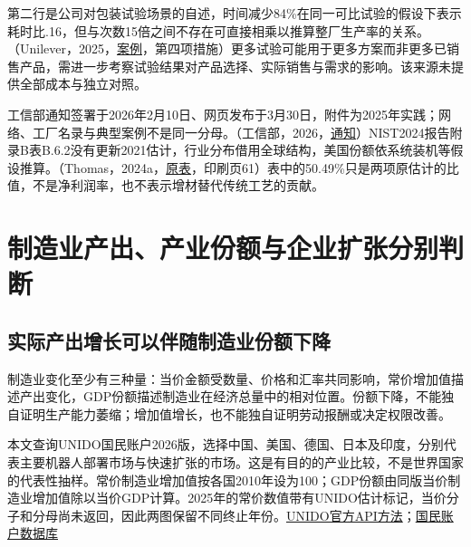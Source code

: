 \documentclass[UTF8,fontset=windows,12pt,a4paper,oneside,openany]{ctexbook}
\begin{document}
第二行是公司对包装试验场景的自述，时间减少84\%在同一可比试验的假设下表示耗时比.16，但与次数15倍之间不存在可直接相乘以推算整厂生产率的关系。（Unilever，2025，\href{https://www.unilever.com/news/news-search/2025/five-ways-unilevers-new-lighthouse-site-applies-ai-for-impact/}{案例}，第四项措施）更多试验可能用于更多方案而非更多已销售产品，需进一步考察试验结果对产品选择、实际销售与需求的影响。该来源未提供全部成本与独立对照。

工信部通知签署于2026年2月10日、网页发布于3月30日，附件为2025年实践；网络、工厂名录与典型案例不是同一分母。（工信部，2026，\href{https://www.miit.gov.cn/ztzl/rdzt/gyhlw/wjfb/art/2026/art_6b35987d001445d49487650795eac294.html}{通知}）NIST2024报告附录B表B.6.2没有更新2021估计，行业分布借用全球结构，美国份额依系统装机等假设推算。（Thomas，2024a，\href{https://tsapps.nist.gov/publication/get_pdf.cfm?pub_id=958865}{原表}，印刷页61）表中的50.49\%只是两项原估计的比值，不是净利润率，也不表示增材替代传统工艺的贡献。

\section{制造业产出、产业份额与企业扩张分别判断}

\subsection{实际产出增长可以伴随制造业份额下降}

制造业变化至少有三种量：当价金额受数量、价格和汇率共同影响，常价增加值描述产出变化，GDP份额描述制造业在经济总量中的相对位置。份额下降，不能独自证明生产能力萎缩；增加值增长，也不能独自证明劳动报酬或决定权限改善。

本文查询UNIDO国民账户2026版，选择中国、美国、德国、日本及印度，分别代表主要机器人部署市场与快速扩张的市场。这是有目的的产业比较，不是世界国家的代表性抽样。常价制造业增加值按各国2010年设为100；GDP份额由同版当价制造业增加值除以当价GDP计算。2025年的常价数值带有UNIDO估计标记，当价分子和分母尚未返回，因此两图保留不同终止年份。\href{https://stat.unido.org/unido-statistics-portal-api}{UNIDO官方API方法}；\href{https://stat.unido.org/data/table?dataset=national-accounts}{国民账户数据库}
\end{document}
